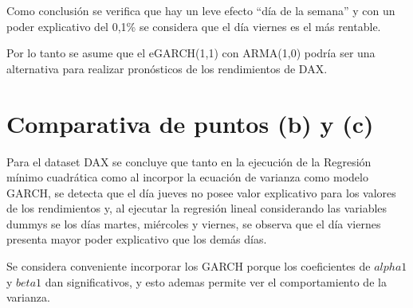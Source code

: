 \documentclass[
  11pt,
]{article}
\begin{document}
Como conclusión se verifica que hay un leve efecto ``día de la semana''
y con un poder explicativo del 0,1\% se considera que el día viernes es
el más rentable.

Por lo tanto se asume que el eGARCH(1,1) con ARMA(1,0) podría ser una
alternativa para realizar pronósticos de los rendimientos de DAX.

\hypertarget{comparativa-de-puntos-b-y-c}{%
\section{Comparativa de puntos (b) y
(c)}\label{comparativa-de-puntos-b-y-c}}

Para el dataset DAX se concluye que tanto en la ejecución de la
Regresión mínimo cuadrática como al incorpor la ecuación de varianza
como modelo GARCH, se detecta que el día jueves no posee valor
explicativo para los valores de los rendimientos y, al ejecutar la
regresión lineal considerando las variables dummys se los días martes,
miércoles y viernes, se observa que el día viernes presenta mayor poder
explicativo que los demás días.

Se considera conveniente incorporar los GARCH porque los coeficientes de
\(alpha1\) y \(beta1\) dan significativos, y esto ademas permite ver el
comportamiento de la varianza.
\end{document}
